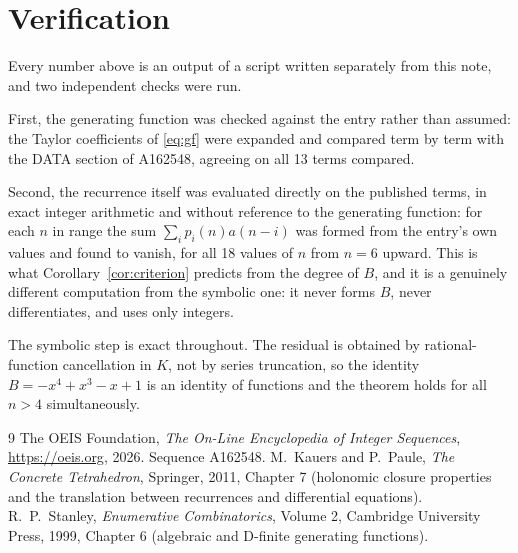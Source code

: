 \documentclass[11pt,a4paper]{article}
\theoremstyle{plain}
\theoremstyle{definition}
\begin{document}
\section{Verification}

Every number above is an output of a script written separately from this note, and two
independent checks were run.

First, the generating function was checked against the entry rather than assumed: the
Taylor coefficients of \eqref{eq:gf} were expanded and compared term by term with the DATA
section of A162548, agreeing on all 13 terms compared.

Second, the recurrence itself was evaluated directly on the published terms, in exact
integer arithmetic and without reference to the generating function: for each $n$ in range
the sum $\sum_{i}p_{i}(n)a(n-i)$ was formed from the entry's own values and found to
vanish, for all 18 values of $n$ from $n=6$ upward. This is what
Corollary~\ref{cor:criterion} predicts from the degree of $B$, and it is a genuinely
different computation from the symbolic one: it never forms $B$, never differentiates, and
uses only integers.

The symbolic step is exact throughout. The residual is obtained by rational-function
cancellation in $K$, not by series truncation, so the identity $B=- x^{4} + x^{3} - x + 1$ is an
identity of functions and the theorem holds for all $n>4$ simultaneously.

\begin{thebibliography}{9}
 The OEIS Foundation, \emph{The On-Line Encyclopedia of Integer Sequences},
\url{https://oeis.org}, 2026. Sequence A162548.
 M.~Kauers and P.~Paule, \emph{The Concrete Tetrahedron}, Springer, 2011,
Chapter 7 (holonomic closure properties and the translation between recurrences and
differential equations).
 R.~P.~Stanley, \emph{Enumerative Combinatorics}, Volume 2, Cambridge
University Press, 1999, Chapter 6 (algebraic and D-finite generating functions).
\end{thebibliography}
\end{document}
